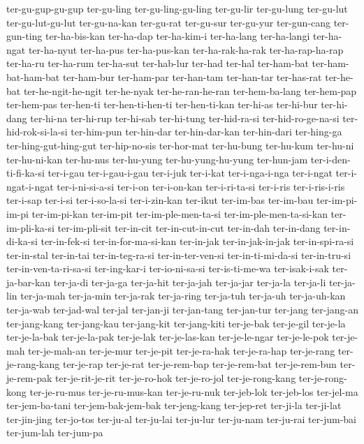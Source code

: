 {ter-gu-gup-gu-gup ter-gu-ling ter-gu-ling-gu-ling ter-gu-lir ter-gu-lung
ter-gu-lut ter-gu-lut-gu-lut ter-gu-na-kan ter-gu-rat ter-gu-sur
ter-gu-yur ter-gun-cang ter-gun-ting ter-ha-bis-kan ter-ha-dap
ter-ha-kim-i ter-ha-lang ter-ha-langi ter-ha-ngat ter-ha-nyut ter-ha-pus
ter-ha-pus-kan ter-ha-rak-ha-rak ter-ha-rap-ha-rap ter-ha-ru ter-ha-rum
ter-ha-sut ter-hab-lur ter-had ter-hal ter-ham-bat ter-ham-bat-ham-bat
ter-ham-bur ter-ham-par ter-han-tam ter-han-tar ter-has-rat ter-he-bat
ter-he-ngit-he-ngit ter-he-nyak ter-he-ran-he-ran ter-hem-ba-lang
ter-hem-pap ter-hem-pas ter-hen-ti ter-hen-ti-hen-ti ter-hen-ti-kan
ter-hi-as ter-hi-bur ter-hi-dang ter-hi-na ter-hi-rup ter-hi-sab
ter-hi-tung ter-hid-ra-si ter-hid-ro-ge-na-si ter-hid-rok-si-la-si
ter-him-pun ter-hin-dar ter-hin-dar-kan ter-hin-dari ter-hing-ga
ter-hing-gut-hing-gut ter-hip-no-sis ter-hor-mat ter-hu-bung ter-hu-kum
ter-hu-ni ter-hu-ni-kan ter-hu-nus ter-hu-yung ter-hu-yung-hu-yung
ter-hun-jam ter-i-den-ti-fi-ka-si ter-i-gau ter-i-gau-i-gau ter-i-juk
ter-i-kat ter-i-nga-i-nga ter-i-ngat ter-i-ngat-i-ngat ter-i-ni-si-a-si
ter-i-on ter-i-on-kan ter-i-ri-ta-si ter-i-ris ter-i-ris-i-ris ter-i-sap
ter-i-si ter-i-so-la-si ter-i-zin-kan ter-ikut ter-im-bas ter-im-bau
ter-im-pi-im-pi ter-im-pi-kan ter-im-pit ter-im-ple-men-ta-si
ter-im-ple-men-ta-si-kan ter-im-pli-ka-si ter-im-pli-sit ter-in-cit
ter-in-cut-in-cut ter-in-dah ter-in-dang ter-in-di-ka-si ter-in-fek-si
ter-in-for-ma-si-kan ter-in-jak ter-in-jak-in-jak ter-in-spi-ra-si
ter-in-stal ter-in-tai ter-in-teg-ra-si ter-in-ter-ven-si
ter-in-ti-mi-da-si ter-in-tru-si ter-in-ven-ta-ri-sa-si ter-ing-kar-i
ter-io-ni-sa-si ter-is-ti-me-wa ter-isak-i-sak ter-ja-bar-kan ter-ja-di
ter-ja-ga ter-ja-hit ter-ja-jah ter-ja-jar ter-ja-la ter-ja-li ter-ja-lin
ter-ja-mah ter-ja-min ter-ja-rak ter-ja-ring ter-ja-tuh ter-ja-uh
ter-ja-uh-kan ter-ja-wab ter-jad-wal ter-jal ter-jan-ji ter-jan-tang
ter-jan-tur ter-jang ter-jang-an ter-jang-kang ter-jang-kau ter-jang-kit
ter-jang-kiti ter-je-bak ter-je-gil ter-je-la ter-je-la-bak ter-je-la-pak
ter-je-lak ter-je-las-kan ter-je-le-ngar ter-je-le-pok ter-je-mah
ter-je-mah-an ter-je-mur ter-je-pit ter-je-ra-hak ter-je-ra-hap
ter-je-rang ter-je-rang-kang ter-je-rap ter-je-rat ter-je-rem-bap
ter-je-rem-bat ter-je-rem-bun ter-je-rem-pak ter-je-rit-je-rit
ter-je-ro-hok ter-je-ro-jol ter-je-rong-kang ter-je-rong-kong
ter-je-ru-mus ter-je-ru-mus-kan ter-je-ru-nuk ter-jeb-lok ter-jeb-los
ter-jel-ma ter-jem-ba-tani ter-jem-bak-jem-bak ter-jeng-kang ter-jep-ret
ter-ji-la ter-ji-lat ter-jin-jing ter-jo-tos ter-ju-al ter-ju-lai
ter-ju-lur ter-ju-nam ter-ju-rai ter-jum-bai ter-jum-lah ter-jum-pa
}
